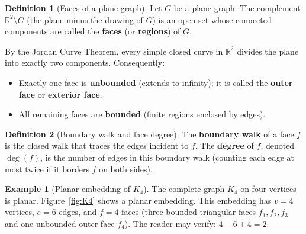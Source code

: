 \documentclass[12pt,a4paper]{article}
\theoremstyle{definition}
\newtheorem{definition}{Definition}[section]
\newtheorem{example}{Example}[section]
\theoremstyle{plain}
\theoremstyle{remark}
\begin{document}
\begin{definition}[Faces of a plane graph]\label{def:faces}
  Let $G$ be a plane graph.  The complement $\mathbb{R}^{2}\setminus G$ (the
  plane minus the drawing of $G$) is an open set whose connected components are
  called the \textbf{faces} (or \textbf{regions}) of $G$.
\end{definition}

By the Jordan Curve Theorem, every simple closed curve in $\mathbb{R}^2$ divides
the plane into exactly two components.  Consequently:

\begin{itemize}
  \item Exactly one face is \textbf{unbounded} (extends to infinity); it is
        called the \textbf{outer face} or \textbf{exterior face}.
  \item All remaining faces are \textbf{bounded} (finite regions enclosed by
        edges).
\end{itemize}

\begin{definition}[Boundary walk and face degree]\label{def:face-degree}
  The \textbf{boundary walk} of a face $f$ is the closed walk that traces the
  edges incident to $f$.  The \textbf{degree} of $f$, denoted $\deg(f)$, is
  the number of edges in this boundary walk (counting each edge at most twice
  if it borders $f$ on both sides).
\end{definition}

\begin{example}[Planar embedding of $K_4$]\label{ex:K4}
  The complete graph $K_4$ on four vertices is planar.  Figure~\ref{fig:K4}
  shows a planar embedding.  This embedding has $v=4$ vertices, $e=6$ edges,
  and $f=4$ faces (three bounded triangular faces $f_1,f_2,f_3$ and one
  unbounded outer face $f_4$).  The reader may verify: $4-6+4=2$.
\end{example}
\end{document}
